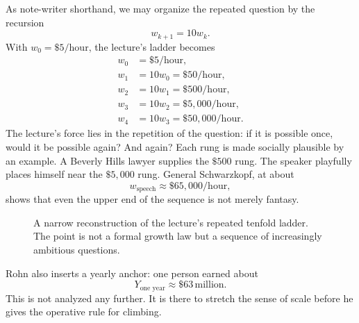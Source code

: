 As note-writer shorthand, we may organize the repeated question by the recursion
\begin{equation}
w_{k+1}=10w_k.
\end{equation}
With \(w_0=\$5/\text{hour}\), the lecture's ladder becomes
\begin{align}
w_0 &= \$5/\text{hour}, \\
w_1 &= 10w_0 = \$50/\text{hour}, \\
w_2 &= 10w_1 = \$500/\text{hour}, \\
w_3 &= 10w_2 = \$5{,}000/\text{hour}, \\
w_4 &= 10w_3 = \$50{,}000/\text{hour}.
\end{align}
The lecture's force lies in the repetition of the question: if it is possible once, would it be possible again? And again? Each rung is made socially plausible by an example. A Beverly Hills lawyer supplies the \(\$500\) rung. The speaker playfully places himself near the \(\$5{,}000\) rung. General Schwarzkopf, at about
\begin{equation}
w_{\mathrm{speech}}\approx \$65{,}000/\text{hour},
\end{equation}
shows that even the upper end of the sequence is not merely fantasy.

\begin{figure}[t]
\centering
{}
\caption{A narrow reconstruction of the lecture's repeated tenfold ladder. The point is not a formal growth law but a sequence of increasingly ambitious questions.}
\end{figure}

Rohn also inserts a yearly anchor: one person earned about
\begin{equation}
Y_{\text{one year}}\approx \$63\,\text{million}.
\end{equation}
This is not analyzed any further. It is there to stretch the sense of scale before he gives the operative rule for climbing.

